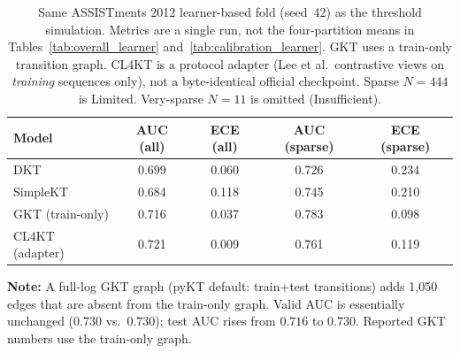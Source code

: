 \begin{table}[htbp]
\caption{Same ASSISTments 2012 learner-based fold (seed~42) as the threshold simulation. Metrics are a single run, not the four-partition means in Tables~\ref{tab:overall_learner} and~\ref{tab:calibration_learner}. GKT uses a train-only transition graph. CL4KT is a protocol adapter (Lee et al.\ contrastive views on \emph{training} sequences only), not a byte-identical official checkpoint. Sparse $N=444$ is Limited. Very-sparse $N=11$ is omitted (Insufficient).}
\label{tab:gkt_cl4kt_fold0}
\centering
\footnotesize
\begin{tabular}{lcccc}
\toprule
Model & AUC (all) & ECE (all) & AUC (sparse) & ECE (sparse) \\
\midrule
DKT & 0.699 & 0.060 & 0.726 & 0.234 \\
SimpleKT & 0.684 & 0.118 & 0.745 & 0.210 \\
GKT (train-only) & 0.716 & 0.037 & 0.783 & 0.098 \\
CL4KT (adapter) & 0.721 & 0.009 & 0.761 & 0.119 \\
\bottomrule
\end{tabular}

\vspace{1ex}
{\scriptsize \textbf{Note:} A full-log GKT graph (pyKT default: train+test transitions) adds 1{,}050 edges that are absent from the train-only graph. Valid AUC is essentially unchanged ($0.730$ vs.\ $0.730$); test AUC rises from $0.716$ to $0.730$. Reported GKT numbers use the train-only graph.\par}
\end{table}
